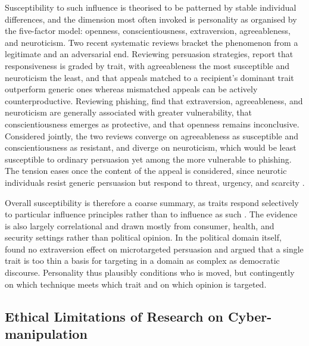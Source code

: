\documentclass[11pt,a4paper]{article}
\begin{document}
Susceptibility to such influence is theorised to be patterned by stable individual
differences, and the dimension most often invoked is personality as organised by the
five-factor model: openness, conscientiousness, extraversion, agreeableness, and
neuroticism. Two recent systematic reviews bracket the phenomenon from a legitimate and an
adversarial end. Reviewing persuasion strategies, \citet{palmtims2025influence} report that
responsiveness is graded by trait, with agreeableness the most susceptible and neuroticism
the least, and that appeals matched to a recipient's dominant trait outperform generic ones
whereas mismatched appeals can be actively counterproductive. Reviewing phishing,
\citet{lopezaguilar2025phishing} find that extraversion, agreeableness, and neuroticism are
generally associated with greater vulnerability, that conscientiousness emerges as
protective, and that openness remains inconclusive. Considered jointly, the two reviews converge
on agreeableness as susceptible and conscientiousness as resistant, and diverge on
neuroticism, which would be least susceptible to ordinary persuasion yet among the more
vulnerable to phishing. The tension eases once the content of the appeal is considered,
since neurotic individuals resist generic persuasion but respond to threat, urgency, and
scarcity \citep{lopezaguilar2025phishing,palmtims2025influence}.

Overall susceptibility is therefore a coarse summary, as traits respond selectively to
particular influence principles rather than to influence as such
\citep{palmtims2025influence}. The evidence is also largely correlational and drawn mostly
from consumer, health, and security settings rather than political opinion. In the political
domain itself, \citet{decker2023personality} found no extraversion effect on microtargeted
persuasion and argued that a single trait is too thin a basis for targeting in a domain as
complex as democratic discourse. Personality thus plausibly conditions who is moved, but
contingently on which technique meets which trait and on which opinion is targeted.

\subsection{Ethical Limitations of Research on Cyber-manipulation}
\end{document}
